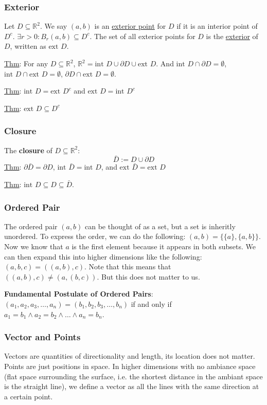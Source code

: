 \subsubsection{Exterior}
Let $D \subseteq \mathbb{R}^2$. We say $(a, b)$ is an
\underline{exterior point} for $D$ if it is an interior point of $D^c$.
$\exists r > 0: B_r(a, b) \subseteq D^c$.
The set of all exterior points for $D$ is the \underline{exterior} of $D$,
written as $\text{ext } D$.
\par \underline{Thm}: For any $D \subseteq \mathbb{R}^2$, $\mathbb{R}^2 =
\text{int } D \cup \partial D \cup \text{ext } D$. And $\text{int } D \cap
\partial D = \emptyset$, $\text{int } D \cap \text{ext } D = \emptyset$,
$\partial D \cap \text{ext } D = \emptyset$.
\par \underline{Thm}: $\text{int } D = \text{ext } D^c$ and $\text{ext } D =
\text{int } D^c$
\par \underline{Thm}: $\text{ext } D \subseteq D^c$

\subsubsection{Closure}
The \textbf{closure} of $D \subseteq \mathbb{R}^2$:
$$\bar{D} := D \cup \partial D$$
\underline{Thm}: $\partial \bar{D} = \partial D$, $\text{int } \bar{D} =
\text{int } D$, and $\text{ext } \bar{D} = \text{ext } D$
\par \underline{Thm}: $\text{int } D \subseteq D \subseteq \bar{D}$.

\subsubsection{Ordered Pair}
The ordered pair $(a, b)$ can be thought of as a set, but a set is inheritly
unordered. To express the order, we can do the following: $(a, b) = \{\{a\},
\{a, b\}\}$. Now we know that $a$ is the first element because it appears in
both subsets.
We can then expand this into higher dimensions like the following:
$(a, b, c) = ((a, b), c)$. Note that this means that $((a, b), c) \neq (a, (b,
c))$. But this does not matter to us.

\textbf{Fundamental Postulate of Ordered Pairs}:
$(a_1, a_2, a_3, \dots, a_n) = (b_1, b_2, b_3, \dots, b_n)$ if and only if $a_1
= b_1 \wedge a_2 = b_2 \wedge \dots \wedge a_n = b_n$.

\subsubsection{Vector and Points}
Vectors are quantities of directionality and length, its location does not
matter. Points are just positions in space. In higher dimensions with no
ambiance space (flat space surrounding the surface, i.e. the shortest distance
in the ambiant space is the straight line),  we define a vector as all
the lines with the same direction at a certain point.

